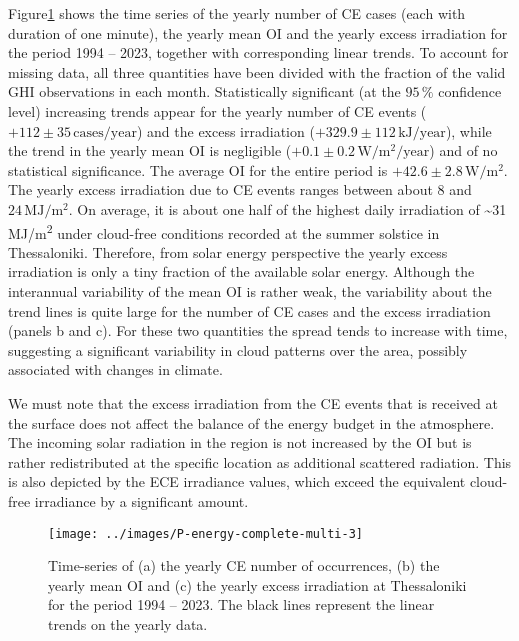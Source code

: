 \documentclass[preprint, 5p,
authoryear]{elsarticle} %
\providecommand{\DIFaddtex}[1]{{\protect\color{blue}\uwave{#1}}} %
\providecommand{\DIFdeltex}[1]{{\protect\color{red}\sout{#1}}}                      %
\providecommand{\DIFaddbegin}{} %
\providecommand{\DIFaddend}{} %
\providecommand{\DIFdelbegin}{} %
\providecommand{\DIFdelend}{} %
\providecommand{\DIFadd}[1]{\texorpdfstring{\DIFaddtex{#1}}{#1}} %
\providecommand{\DIFdel}[1]{\texorpdfstring{\DIFdeltex{#1}}{}} %
\newcommand{\DIFscaledelfig}{0.5}
\newlength{\DIFdelgraphicswidth} %
\newlength{\DIFdelgraphicsheight} %
\newcommand{\DIFaddincludegraphics}[2][]{{\color{blue}\fbox{\DIFOincludegraphics[#1]{#2}}}} %
\newcommand{\DIFdelincludegraphics}[2][]{%
\sbox{\DIFdelgraphicsbox}{\DIFOincludegraphics[#1]{#2}}%
\settoboxwidth{\DIFdelgraphicswidth}{\DIFdelgraphicsbox} %
\settoboxtotalheight{\DIFdelgraphicsheight}{\DIFdelgraphicsbox} %
\scalebox{\DIFscaledelfig}{%
\parbox[b]{\DIFdelgraphicswidth}{\usebox{\DIFdelgraphicsbox}\\[-\baselineskip] \rule{\DIFdelgraphicswidth}{0em}}\llap{\resizebox{\DIFdelgraphicswidth}{\DIFdelgraphicsheight}{%
\setlength{\unitlength}{\DIFdelgraphicswidth}%
\begin{picture}(1,1)%
\thicklines\linethickness{2pt} %
{\color[rgb]{1,0,0}\put(0,0){\framebox(1,1){}}}%
{\color[rgb]{1,0,0}\put(0,0){\line( 1,1){1}}}%
{\color[rgb]{1,0,0}\put(0,1){\line(1,-1){1}}}%
\end{picture}%
}\hspace*{3pt}}} %
} %
\DeclareRobustCommand{\DIFaddbegin}{\DIFOaddbegin \let\includegraphics\DIFaddincludegraphics} %
\DeclareRobustCommand{\DIFaddend}{\DIFOaddend \let\includegraphics\DIFOincludegraphics} %
\DeclareRobustCommand{\DIFdelbegin}{\DIFOdelbegin \let\includegraphics\DIFdelincludegraphics} %
\DeclareRobustCommand{\DIFdelend}{\DIFOaddend \let\includegraphics\DIFOincludegraphics} %
\begin{document}
Figure\nobreakspace{}\ref{fig:P-energy} shows the time series of the
yearly number of CE cases (each with duration of one minute), the yearly
mean OI and the yearly excess irradiation for the period 1994 -- 2023,
together with corresponding linear trends. To account for missing data,
all three quantities have been divided with the fraction of the valid
GHI observations in each month. Statistically significant (at the
\(95\,\%\) confidence level) increasing trends appear for the yearly
number of CE events (\(+112\pm 35\,\text{cases}/\text{year}\)) and the
excess irradiation (\DIFdelbegin \DIFdel{\(+329.9 \pm 112\,\text{kJ}/\text{year}\)}\DIFdelend \DIFaddbegin \DIFadd{\(+329.9\pm 112.0\,\text{kJ}/\text{year}\)}\DIFaddend ), while
the trend in the yearly mean OI is negligible
(\(+0.1\pm 0.2\,\text{W}/\text{m}^2/\text{year}\)) and of no statistical
significance. The average OI for the entire period is
\(+42.6\pm 2.8\,\text{W}/\text{m}^2\). The yearly excess irradiation due
to CE events ranges between about \(8\) and
\(24\,\text{MJ}/\text{m}^2\). On average, it is about one half of the
highest daily irradiation of \textasciitilde31 MJ/m\textsuperscript{2}
under cloud-free conditions recorded at the summer solstice in
Thessaloniki. Therefore, from solar energy perspective the yearly excess
irradiation is only a tiny fraction of the available solar energy.
Although the interannual variability of the mean OI is rather weak, the
variability about the trend lines is quite large for the number of CE
cases and the excess irradiation (panels b and c). For these two
quantities the spread tends to increase with time, suggesting a
significant variability in cloud patterns over the area, possibly
associated with changes in climate.

We must note that the excess irradiation from the CE events that is
received at the surface does not affect the balance of the energy budget
in the atmosphere. The incoming solar radiation in the region is not
increased by the OI but is rather redistributed at the specific location
as additional scattered radiation. This is also depicted by the ECE
irradiance values, which exceed the equivalent cloud-free irradiance by
a significant amount.

\begin{figure}

{\centering \texttt{[image: ../images/P-energy-complete-multi-3]} 

}

\caption{Time-series of (a) the yearly CE number of occurrences, (b) the yearly mean OI and (c) the yearly excess irradiation at Thessaloniki for the period 1994 – 2023. The black lines represent the linear trends on the yearly data.}\label{fig:P-energy}
\end{figure}
\end{document}
